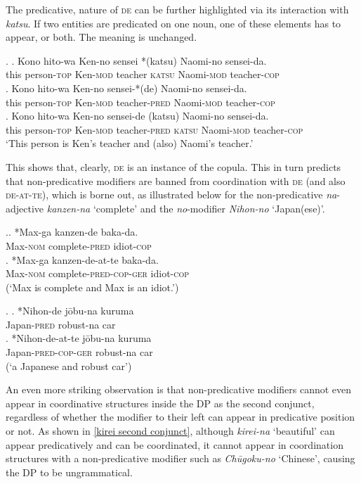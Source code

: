 The predicative, nature of \textsc{de} can be further highlighted via its interaction with \textit{katsu}. If two entities are predicated on one noun, one of these elements has to appear, or both. The meaning is unchanged.  

\ex. \ag. Kono hito-wa Ken-no sensei *(katsu) Naomi-no sensei-da.\\
this person-\textsc{top} Ken-\textsc{mod} teacher \textsc{katsu} Naomi-\textsc{mod} teacher-\textsc{cop}\\
\bg. Kono hito-wa Ken-no sensei-*(de) Naomi-no sensei-da.\\
this person-\textsc{top} Ken-\textsc{mod} teacher-\textsc{pred} Naomi-\textsc{mod} teacher-\textsc{cop}\\
\cg. Kono hito-wa Ken-no sensei-de (katsu) Naomi-no sensei-da.\\
this person-\textsc{top} Ken-\textsc{mod} teacher-\textsc{pred} \textsc{katsu} Naomi-\textsc{mod} teacher-\textsc{cop}\\
`This person is Ken's teacher and (also) Naomi's teacher.’ \\ \null \hfill \citep[364–365]{hiraiwa:2012:mechanism}

This shows that, clearly, \textsc{de} is an instance of the copula. This in turn predicts that non-predicative modifiers are banned from coordination with \textsc{de} (and also \textsc{de-at-te}), which is borne out, as illustrated below for the non-predicative \textit{na}-adjective \textit{kanzen-na} `complete’ and the \textit{no}-modifier \textit{Nihon-no} `Japan(ese)’.

\ex.\ag. *Max-ga kanzen-de baka-da.\\
Max-\textsc{nom} complete-\textsc{pred} idiot-\textsc{cop}\\
\bg. *Max-ga kanzen-de-at-te baka-da.\\
Max-\textsc{nom} complete-\textsc{pred-cop-ger} idiot-\textsc{cop}\\
(`Max is complete and Max is an idiot.’)

\ex. \ag. *Nihon-de jōbu-na kuruma\\
Japan-\textsc{pred} robust-na car\\
\bg. *Nihon-de-at-te jōbu-na kuruma\\
Japan-\textsc{pred-cop-ger} robust-na car\\
(`a Japanese and robust car’)

An even more striking observation is that non-predicative modifiers cannot even appear in coordinative structures inside the DP as the second conjunct, regardless of whether the modifier to their left can appear in predicative position or not. As shown in \ref{kirei second conjunct}, although \textit{kirei-na} `beautiful’ can appear predicatively and can be coordinated, it cannot appear in coordination structures with a non-predicative modifier such as \textit{Chūgoku-no} `Chinese’, causing the DP to be ungrammatical.

